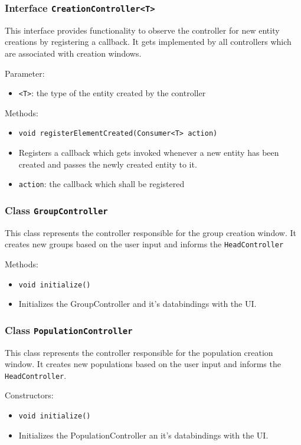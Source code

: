 \documentclass[parskip=full,11pt]{scrartcl}
\begin{document}
\subsubsection{Interface \texttt{CreationController<T>}}

This interface provides functionality to observe the controller for new entity creations by registering a callback. It gets implemented by all controllers which are associated with creation windows.

Parameter:
\begin{itemize} \itemsep -10pt
	\item \texttt{<T>}: the type of the entity created by the controller
\end{itemize}

Methods:
\begin{itemize}\itemsep -10pt
\item \texttt{void registerElementCreated(Consumer<T> action)}
\item[] Registers a callback which gets invoked whenever a new entity has been created and passes the newly created entity to it.
\item[] \texttt{action}: the callback which shall be registered
\end{itemize}

\subsubsection{Class \texttt{GroupController}}
This class represents the controller responsible for the group creation window. It creates new groups based on the user input and informs the \texttt{HeadController}

Methods:
\begin{itemize}\itemsep -10pt
\item \texttt{void initialize()}
\item[] Initializes the GroupController and it's databindings with the UI.
\end{itemize}

\subsubsection{Class \texttt{PopulationController}}
This class represents the controller responsible for the population creation window. It creates new populations based on the user input and informs the \texttt{HeadController}.

Constructors:
\begin{itemize}\itemsep -10pt
\item \texttt{void initialize()}
\item[] Initializes the PopulationController an it's databindings with the UI.
\end{itemize}
\end{document}
